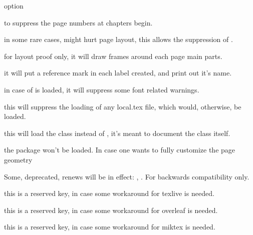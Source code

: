 \documentclass[article,nofontwarning,nogeometry,english,tocdepth=3,secdepth=3]{ufrgscca} %
\begin{document}
\begin{describelist}{option}

	 { to suppress the page numbers at chapters begin.}

	 { in some rare cases,  might hurt page layout, this allows the suppression of .}

	 { for layout proof only, it will draw frames around each page main parts.}

	 { it will put a reference mark in each label created, and print out it's name.}

	 { in case of  is loaded, it will suppress some font related warnings.}

	 { this will suppress the loading of any local.tex file, which would, otherwise, be loaded.}

	 { this will load the  class   instead of , it's meant to document the class itself.}

	 { the package  won't be loaded. In case one wants to fully customize the page geometry}

	 { Some, deprecated, renews will be in effect: \tsobj{\maketitle}, \tsobj{\author} \tsobj{\begin{abstract}}. For backwards compatibility only. }

	 { this is a reserved key, in case some workaround for texlive is needed.}

	 { this is a reserved key, in case some workaround for overleaf is needed.}

	 { this is a reserved key, in case some workaround for miktex is needed.}
\end{describelist}
\end{document}
